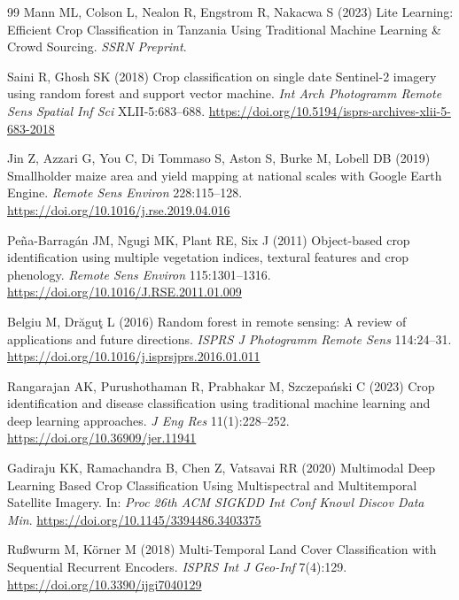\documentclass[pdflatex,sn-mathphys]{sn-jnl} %
\begin{document}
\begin{thebibliography}{99}
Mann ML, Colson L, Nealon R, Engstrom R, Nakacwa S (2023) Lite Learning: Efficient Crop Classification in Tanzania Using Traditional Machine Learning \& Crowd Sourcing. \textit{SSRN Preprint}.


Saini R, Ghosh SK (2018) Crop classification on single date Sentinel-2 imagery using random forest and support vector machine. \textit{Int Arch Photogramm Remote Sens Spatial Inf Sci} XLII-5:683--688. \href{https://doi.org/10.5194/isprs-archives-xlii-5-683-2018}{https://doi.org/10.5194/isprs-archives-xlii-5-683-2018}

Jin Z, Azzari G, You C, Di Tommaso S, Aston S, Burke M, Lobell DB (2019) Smallholder maize area and yield mapping at national scales with Google Earth Engine. \textit{Remote Sens Environ} 228:115--128. \href{https://doi.org/10.1016/j.rse.2019.04.016}{https://doi.org/10.1016/j.rse.2019.04.016}

Pe\~na-Barrag\'an JM, Ngugi MK, Plant RE, Six J (2011) Object-based crop identification using multiple vegetation indices, textural features and crop phenology. \textit{Remote Sens Environ} 115:1301--1316. \href{https://doi.org/10.1016/J.RSE.2011.01.009}{https://doi.org/10.1016/J.RSE.2011.01.009}

Belgiu M, Dr\u{a}gu\c{t} L (2016) Random forest in remote sensing: A review of applications and future directions. \textit{ISPRS J Photogramm Remote Sens} 114:24--31. \href{https://doi.org/10.1016/j.isprsjprs.2016.01.011}{https://doi.org/10.1016/j.isprsjprs.2016.01.011}

Rangarajan AK, Purushothaman R, Prabhakar M, Szczepa\'nski C (2023) Crop identification and disease classification using traditional machine learning and deep learning approaches. \textit{J Eng Res} 11(1):228--252. \href{https://doi.org/10.36909/jer.11941}{https://doi.org/10.36909/jer.11941}

Gadiraju KK, Ramachandra B, Chen Z, Vatsavai RR (2020) Multimodal Deep Learning Based Crop Classification Using Multispectral and Multitemporal Satellite Imagery. In: \textit{Proc 26th ACM SIGKDD Int Conf Knowl Discov Data Min}. \href{https://doi.org/10.1145/3394486.3403375}{https://doi.org/10.1145/3394486.3403375}

Ru\ss{}wurm M, K\"orner M (2018) Multi-Temporal Land Cover Classification with Sequential Recurrent Encoders. \textit{ISPRS Int J Geo-Inf} 7(4):129. \href{https://doi.org/10.3390/ijgi7040129}{https://doi.org/10.3390/ijgi7040129}


\end{thebibliography}
\end{document}
